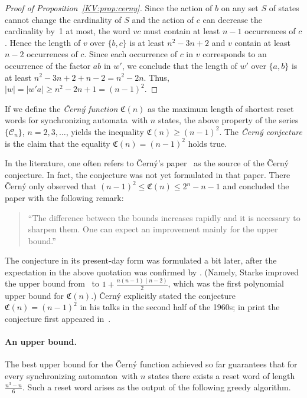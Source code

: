 \documentclass{irmaart}
\newcommand{\sa}{synchronizing au\-tom\-a\-ta}
\newcommand{\san}{synchronizing au\-tom\-a\-ton}
\theoremstyle{plain}
\begin{document}
\begin{proof}[Proof of Proposition~\ref{KV:prop:cerny}]
Since the action of $b$ on any set $S$ of states cannot change the
cardinality of $S$ and the action of $c$ can decrease the
cardinality by~1 at most, the word $vc$ must contain at least
$n-1$ occurrences of $c$. Hence the length of $v$ over $\{b,c\}$
is at least $n^2-3n+2$ and $v$ contain at least $n-2$ occurrences
of $c$. Since each occurrence of $c$ in $v$ corresponds to an
occurrence of the factor $ab$ in $w'$, we conclude that the length
of $w'$ over $\{a,b\}$ is at least $n^2-3n+2+n-2=n^2-2n$. Thus,
$|w|=|w'a|\ge n^2-2n+1=(n-1)^2$.
\end{proof}

If we define the \emph{\v{C}ern\'{y} function} $\mathfrak{C}(n)$ as the maximum length of shortest reset words for
\sa\ with $n$ states, the above property of the series $\{\mathcal{C}_{n}\}$,
$n=2,3,\dotsc$, yields the inequality $\mathfrak{C}(n)\ge(n-1)^2$. The
\emph{\v{C}ern\'{y} conjecture} is the
claim that the equality $\mathfrak{C}(n)=(n-1)^2$ holds true.

In the literature, one often refers to \v{C}ern\'{y}'s paper~\cite{Cerny:1964}
as the source of the \v{C}ern\'{y} conjecture. In fact, the conjecture was not
yet formulated in that paper. There \v{C}ern\'{y} only observed that
$(n-1)^2\le \mathfrak{C}(n)\le 2^n-n-1$ and concluded the paper with the
following remark:
\begin{quote}
``The difference between the bounds increases rapidly and it is necessary to
sharpen them. One can expect an improvement mainly for the upper bound.''
\end{quote}
The conjecture in its present-day form was formulated a bit later, after the
expectation in the above quotation was confirmed by \cite{Starke:1966}.
(Namely, Starke improved the upper bound from~\cite{Cerny:1964} to
$1+\frac{n(n-1)(n-2)}2$, which was the first polynomial upper bound for
$\mathfrak{C}(n)$.) \v{C}ern\'{y} explicitly stated the conjecture
$\mathfrak{C}(n)=(n-1)^2$ in his talks in the second half of the 1960s; in
print the conjecture first appeared in~\cite{Cerny&Piricka&Rosenauerova:1971}.

\paragraph*{An upper bound.} The best upper bound for the \v{C}ern\'{y}
function achieved so far guarantees that for every \san\ with $n$ states there
exists a reset word of length $\frac{n^3-n}6$. Such a reset word arises as the
output of the following greedy algorithm.
\end{document}
